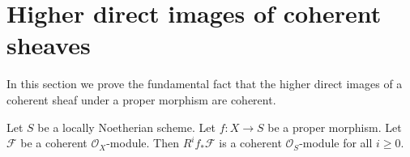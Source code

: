 \section{Higher direct images of coherent sheaves}
\label{section-proper-pushforward}

\noindent
In this section we prove the fundamental fact that the higher
direct images of a coherent sheaf under a proper morphism
are coherent.

\begin{proposition}
\label{proposition-proper-pushforward-coherent}
\begin{reference}
\cite[III Theorem 3.2.1]{EGA}
\end{reference}
Let $S$ be a locally Noetherian scheme.
Let $f : X \to S$ be a proper morphism.
Let $\mathcal{F}$ be a coherent $\mathcal{O}_X$-module.
Then $R^if_*\mathcal{F}$ is a coherent $\mathcal{O}_S$-module
for all $i \geq 0$.
\end{proposition}

